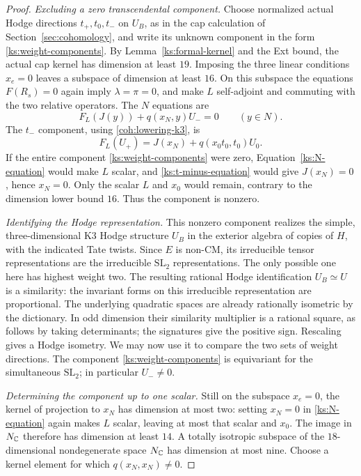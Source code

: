 \begin{proof}
\emph{Excluding a zero transcendental component.}
Choose normalized actual Hodge directions $t_+,t_0,t_-$
on $U_B$, as in the cap calculation of
Section~\ref{sec:cohomology}, and write its unknown component
in the form \eqref{ks:weight-components}.
By Lemma~\ref{ks:formal-kernel} and the Ext bound, the actual
cap kernel has dimension at least $19$.  Imposing the three
linear conditions $x_e=0$ leaves a subspace of dimension at
least $16$.  On this subspace the
equations $F(R_s)=0$ again imply $\lambda=\pi=0$, and
make $L$ self-adjoint and commuting with the two relative
operators.  The $N$ equations are
\begin{equation}
 \label{ks:N-equation}
 F_L(J(y))+q(x_N,y)U_-=0\qquad(y\in N).
\end{equation}
The $t_-$ component, using \eqref{coh:lowering-k3}, is
\begin{equation}
 \label{ks:t-minus-equation}
 F_L(U_+)=J(x_N)+q(x_0t_0,t_0)U_0.
\end{equation}
If the entire component \eqref{ks:weight-components} were
zero, Equation~\eqref{ks:N-equation} would make $L$ scalar,
and \eqref{ks:t-minus-equation} would give $J(x_N)=0$,
hence $x_N=0$.
Only the scalar $L$ and $x_0$ would remain, contrary to
the dimension lower bound $16$.  Thus the component is
nonzero.

\emph{Identifying the Hodge representation.}
This nonzero component realizes the simple, three-dimensional
K3 Hodge structure $U_B$ in the exterior algebra of copies of
$H$, with the indicated Tate twists.  Since $E$ is non-CM,
its irreducible tensor representations are the irreducible
$\mathrm{SL}_2$ representations.  The only possible one here
has highest weight two.  The resulting rational Hodge
identification $U_B\simeq U$ is a similarity: the invariant
forms on this irreducible representation are proportional.
The underlying quadratic spaces are already rationally
isometric by the dictionary.  In odd dimension their similarity
multiplier is a rational square, as follows by taking
determinants; the signatures give the positive sign.  Rescaling
gives a Hodge isometry.  We may now use it to compare the two
sets of weight directions.  The component
\eqref{ks:weight-components} is equivariant for the simultaneous
$\mathrm{SL}_2$; in particular $U_-\ne0$.

\emph{Determining the component up to one scalar.}
Still on the subspace $x_e=0$, the kernel of projection
to $x_N$ has dimension at most two: setting $x_N=0$
in \eqref{ks:N-equation} again makes $L$ scalar, leaving
at most that scalar and $x_0$.  The image in $N_{\mathbb C}$
therefore has dimension at least $14$.  A totally isotropic
subspace of the $18$-dimensional nondegenerate space
$N_{\mathbb C}$ has dimension at most nine.  Choose a kernel
element for which $q(x_N,x_N)\ne0$.


\end{proof}

